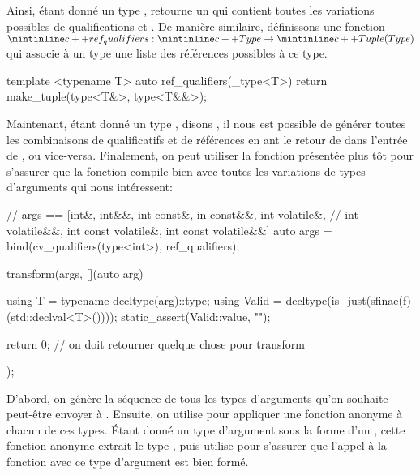 Ainsi, étant donné un type ,  retourne un 
qui contient toutes les variations possibles de qualifications  et
. De manière similaire, définissons une fonction $\cc{ref_qualifiers}
: \cc{Type} \to \cc{Tuple(Type)}$ qui associe à un type une liste des références
possibles à ce type.
\begin{cpp}
    template <typename T>
    auto ref_qualifiers(_type<T>) {
        return make_tuple(type<T&>, type<T&&>);
    }
\end{cpp}

Maintenant, étant donné un type , disons , il nous est possible
de générer toutes les combinaisons de qualificatifs  et de
références en ant le retour de  dans l'entrée de
, ou vice-versa. Finalement, on peut utiliser la fonction
 présentée plus tôt pour s'assurer que la fonction  compile
bien avec toutes les variations de types d'arguments qui nous intéressent:
\begin{cpp}
    // args == [int&, int&&, int const&, in const&&, int volatile&,
    //          int volatile&&, int const volatile&, int const volatile&&]
    auto args = bind(cv_qualifiers(type<int>), ref_qualifiers);

    transform(args, [](auto arg) {
        using T = typename decltype(arg)::type;
        using Valid = decltype(is_just(sfinae(f)(std::declval<T>())));
        static_assert(Valid::value, "");

        return 0; // on doit retourner quelque chose pour transform
    });
\end{cpp}

D'abord, on génère la séquence de tous les types d'arguments qu'on souhaite
peut-être envoyer à . Ensuite, on utilise  pour appliquer
une fonction anonyme à chacun de ces types. Étant donné un type d'argument
sous la forme d'un , cette fonction anonyme extrait le type
, puis utilise  pour s'assurer que l'appel à la fonction
 avec ce type d'argument est bien formé.
